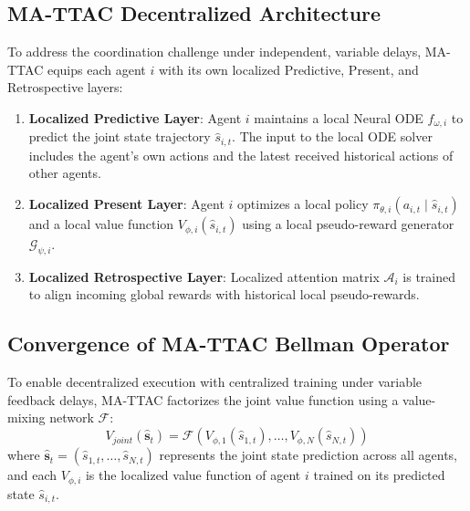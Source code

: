 \documentclass[manuscript, screen, review]{jair}
\begin{document}
\subsection{MA-TTAC Decentralized Architecture}
To address the coordination challenge under independent, variable delays, MA-TTAC equips each agent $i$ with its own localized Predictive, Present, and Retrospective layers:
\begin{enumerate}
    \item \textbf{Localized Predictive Layer}: Agent $i$ maintains a local Neural ODE $f_{\omega, i}$ to predict the joint state trajectory $\hat{s}_{i, t}$. The input to the local ODE solver includes the agent's own actions and the latest received historical actions of other agents.
    \item \textbf{Localized Present Layer}: Agent $i$ optimizes a local policy $\pi_{\theta, i}(a_{i, t} \mid \hat{s}_{i, t})$ and a local value function $V_{\phi, i}(\hat{s}_{i, t})$ using a local pseudo-reward generator $\mathcal{G}_{\psi, i}$.
    \item \textbf{Localized Retrospective Layer}: Localized attention matrix $\mathcal{A}_{i}$ is trained to align incoming global rewards with historical local pseudo-rewards.
\end{enumerate}

\subsection{Convergence of MA-TTAC Bellman Operator}
To enable decentralized execution with centralized training under variable feedback delays, MA-TTAC factorizes the joint value function using a value-mixing network $\mathcal{F}$:
\begin{equation}
    V_{joint}(\hat{\mathbf{s}}_t) = \mathcal{F}\left( V_{\phi, 1}(\hat{s}_{1, t}), \dots, V_{\phi, N}(\hat{s}_{N, t}) \right)
\end{equation}
where $\hat{\mathbf{s}}_t = (\hat{s}_{1, t}, \dots, \hat{s}_{N, t})$ represents the joint state prediction across all agents, and each $V_{\phi, i}$ is the localized value function of agent $i$ trained on its predicted state $\hat{s}_{i, t}$.
\end{document}
